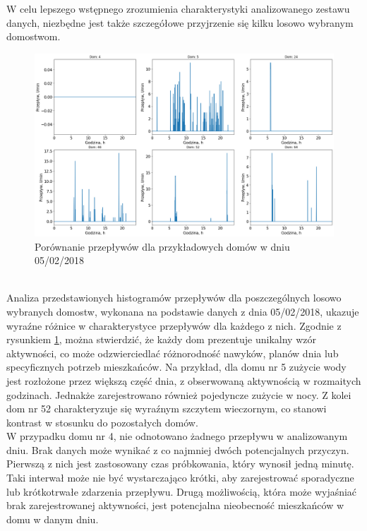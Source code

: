\documentclass[a4paper,twoside,12pt]{book}
\begin{document}
W celu lepszego wstępnego zrozumienia charakterystyki analizowanego zestawu danych, niezbędne jest także szczegółowe przyjrzenie się kilku losowo wybranym domostwom.\\
\begin{figure}[!h]
  \centering
  \includegraphics[width=1\textwidth]{img/Dane_nowe_compare.png}
  \caption{Porównanie przepływów dla przykładowych domów w dniu 05/02/2018}
  \label{fig:przepływy}
\end{figure}\\
Analiza przedstawionych histogramów przepływów dla poszczególnych losowo wybranych domostw, wykonana na podstawie danych z dnia 05/02/2018, ukazuje wyraźne różnice w charakterystyce przepływów dla każdego z nich. Zgodnie z rysunkiem \ref{fig:przepływy}, można stwierdzić, że każdy dom prezentuje unikalny wzór aktywności, co może odzwierciedlać różnorodność nawyków, planów dnia lub specyficznych potrzeb mieszkańców. Na przykład, dla domu nr 5 zużycie wody jest rozłożone przez większą część dnia, z obserwowaną aktywnością w rozmaitych godzinach. Jednakże zarejestrowano również pojedyncze zużycie w nocy. Z kolei dom nr 52 charakteryzuje się wyraźnym szczytem wieczornym, co stanowi kontrast w stosunku do pozostałych domów.\\W przypadku domu nr 4, nie odnotowano żadnego przepływu w analizowanym dniu. Brak danych może wynikać z co najmniej dwóch potencjalnych przyczyn. Pierwszą z nich jest zastosowany czas próbkowania, który wynosił jedną minutę. Taki interwał może nie być wystarczająco krótki, aby zarejestrować sporadyczne lub krótkotrwałe zdarzenia przepływu. Drugą możliwością, która może wyjaśniać brak zarejestrowanej aktywności, jest potencjalna nieobecność mieszkańców w domu w danym dniu.
\end{document}
